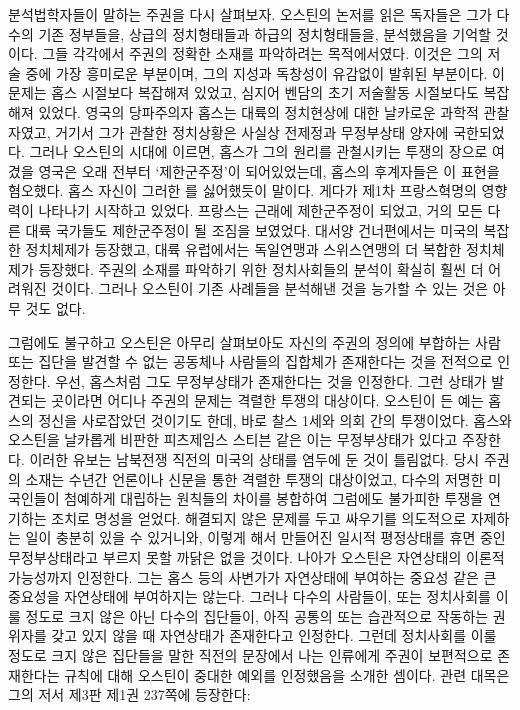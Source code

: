 분석법학자들이 말하는 주권을 다시 살펴보자.
오스틴의 논저를 읽은 독자들은
그가 다수의 기존 정부들을,
 상급의 정치형태들과 하급의 정치형태들을,
분석했음을 기억할 것이다.
그들 각각에서 주권의 정확한 소재를 파악하려는 목적에서였다.
이것은 그의 저술 중에 가장 흥미로운 부분이며,
그의 지성과 독창성이 유감없이 발휘된 부분이다.
이 문제는 홉스 시절보다 복잡해져 있었고, 심지어
벤담의 초기 저술활동 시절보다도 복잡해져 있었다.
영국의 당파주의자 홉스는 대륙의 정치현상에 대한 날카로운 과학적 관찰자였고,
거기서 그가 관찰한 정치상황은 
사실상 전제정과 무정부상태 양자에 국한되었다.
그러나 오스틴의 시대에 이르면,
홉스가 그의 원리를 관철시키는 투쟁의 장으로 여겼을 영국은
오래 전부터 `제한군주정'이 되어있었는데,
홉스의 후계자들은
이 표현을 혐오했다.
홉스 자신이 그러한 를 싫어했듯이 말이다.
게다가 제1차 프랑스혁명의 영향력이 나타나기 시작하고 있었다.
프랑스는 근래에 제한군주정이 되었고,
거의 모든 다른 대륙 국가들도 제한군주정이 될 조짐을 보였었다.
대서양 건너편에서는 미국의 복잡한 정치체제가 등장했고,
대륙 유럽에서는 독일연맹과 스위스연맹의 더 복합한 정치체제가 등장했다.
주권의 소재를 파악하기 위한 정치사회들의 분석이
확실히 훨씬 더 어려워진 것이다.
그러나
오스틴이 기존 사례들을 분석해낸 것을 능가할 수 있는 것은 아무 것도 없다.

그럼에도 불구하고 오스틴은
아무리 살펴보아도 자신의 주권의 정의에 부합하는 사람 또는 집단을
발견할 수 없는 공동체나 사람들의 집합체가 존재한다는 것을 전적으로 인정한다.
우선, 홉스처럼 그도 무정부상태가 존재한다는 것을 인정한다.
그런 상태가 발견되는 곳이라면 어디나
주권의 문제는 격렬한 투쟁의 대상이다.
오스틴이 든 예는 홉스의 정신을 사로잡았던 것이기도 한데,
바로 찰스 1세와 의회 간의 투쟁이었다.
홉스와 오스틴을 날카롭게 비판한 피츠제임스 스티븐
같은 이는  무정부상태가 있다고 주장한다.
이러한 유보는 남북전쟁 직전의 미국의 상태를 염두에 둔 것이 틀림없다.
당시 주권의 소재는 수년간 언론이나 신문을 통한 격렬한 투쟁의 대상이었고,
다수의 저명한 미국인들이 첨예하게 대립하는 원칙들의 차이를 봉합하여
그럼에도 불가피한 투쟁을 연기하는 조치로 명성을 얻었다.
해결되지 않은 문제를 두고 싸우기를 의도적으로 자제하는 일이 충분히 있을 수
있거니와, 이렇게 해서 만들어진 일시적 평정상태를 휴면 중인 무정부상태라고
부르지 못할 까닭은 없을 것이다.
나아가 오스틴은 자연상태의 이론적 가능성까지 인정한다.
그는 홉스 등의 사변가가 자연상태에 부여하는 중요성 같은
큰 중요성을 자연상태에 부여하지는 않는다.
그러나 다수의 사람들이, 또는
정치사회를 이룰 정도로 크지 않은 아닌 다수의 집단들이,
아직 공통의 또는 습관적으로 작동하는 권위자를 갖고 있지 않을 때
자연상태가 존재한다고 인정한다.
그런데
정치사회를 이룰 정도로 크지 않은 집단들을 말한 직전의 문장에서
나는 인류에게 주권이 보편적으로 존재한다는 규칙에 대해 오스틴이 중대한 예외를
인정했음을 소개한 셈이다.
관련 대목은 그의 저서 제3판 제1권 237쪽에 등장한다:


